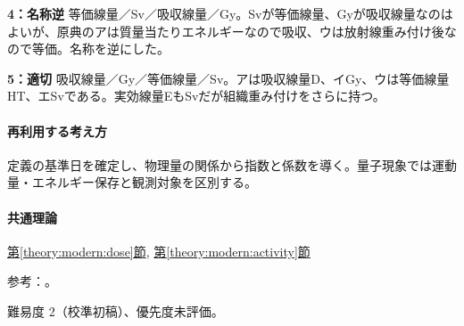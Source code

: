\noindent\textbf{4：名称逆} 等価線量／Sv／吸収線量／Gy。Svが等価線量、Gyが吸収線量なのはよいが、原典のアは質量当たりエネルギーなので吸収、ウは放射線重み付け後なので等価。名称を逆にした。\par

\noindent\textbf{5：適切} 吸収線量／Gy／等価線量／Sv。アは吸収線量D、イGy、ウは等価線量HT、エSvである。実効線量EもSvだが組織重み付けをさらに持つ。\par

\paragraph{再利用する考え方} 定義の基準日を確定し、物理量の関係から指数と係数を導く。量子現象では運動量・エネルギー保存と観測対象を区別する。

\paragraph{共通理論} \hyperref[theory:modern:dose]{第\ref*{theory:modern:dose}節}, \hyperref[theory:modern:activity]{第\ref*{theory:modern:activity}節}

\par 参考：\cite{modern_dose,si_brochure9}。

\par 難易度 2（校準初稿）、優先度未評価。

